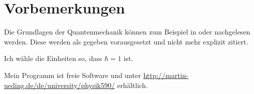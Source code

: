
\chapter*{Vorbemerkungen}

Die Grundlagen der Quantenmechanik können zum Beispiel in
\parencite{Schwabl/Quantenmechanik} oder \parencite{nolting-theo5} nachgelesen
werden. Diese werden als gegeben vorausgesetzt und nicht mehr explizit zitiert.

Ich wähle die Einheiten so, dass $\hbar = 1$ ist.

Mein Programm ist freie Software und unter
\url{http://martin-ueding.de/de/university/physik590/} erhältlich.

